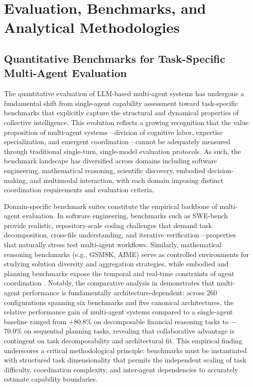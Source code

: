 \documentclass[11pt,a4paper]{article}
\begin{document}
\section{Evaluation, Benchmarks, and Analytical Methodologies}



\subsection{Quantitative Benchmarks for Task-Specific Multi-Agent Evaluation}


The quantitative evaluation of LLM-based multi-agent systems has undergone a fundamental shift from single-agent capability assessment toward task-specific benchmarks that explicitly capture the structural and dynamical properties of collective intelligence. This evolution reflects a growing recognition that the value proposition of multi-agent systems---division of cognitive labor, expertise specialization, and emergent coordination---cannot be adequately measured through traditional single-turn, single-model evaluation protocols. As such, the benchmark landscape has diversified across domains including software engineering, mathematical reasoning, scientific discovery, embodied decision-making, and multimodal interaction, with each domain imposing distinct coordination requirements and evaluation criteria.

Domain-specific benchmark suites constitute the empirical backbone of multi-agent evaluation. In software engineering, benchmarks such as SWE-bench provide realistic, repository-scale coding challenges that demand task decomposition, cross-file understanding, and iterative verification---properties that naturally stress test multi-agent workflows. Similarly, mathematical reasoning benchmarks (e.g., GSM8K, AIME) serve as controlled environments for studying solution diversity and aggregation strategies, while embodied and planning benchmarks expose the temporal and real-time constraints of agent coordination \cite{arxiv:2503.01935v1}. Notably, the comparative analysis in \cite{arxiv:2512.08296v3} demonstrates that multi-agent performance is fundamentally architecture-dependent: across 260 configurations spanning six benchmarks and five canonical architectures, the relative performance gain of multi-agent systems compared to a single-agent baseline ranged from +80.8\% on decomposable financial reasoning tasks to $-$70.0\% on sequential planning tasks, revealing that collaborative advantage is contingent on task decomposability and architectural fit. This empirical finding underscores a critical methodological principle: benchmarks must be instantiated with structured task dimensionality that permits the independent scaling of task difficulty, coordination complexity, and inter-agent dependencies to accurately estimate capability boundaries.
\end{document}
